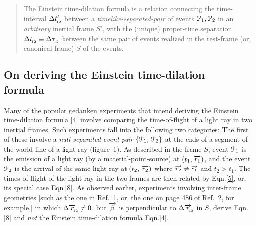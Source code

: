 \begin{quote} The Einstein time-dilation formula is a
relation connecting the time-interval $\Delta 
t'_{_{\hspace*{-1.5pt}{12}}}$ 
between a \textsl{timelike-sepa\break rated-pair} of events 
$\EuScript{P}_1 , \EuScript{P}_2$ in an 
\textsl{arbitrary} 
inertial frame $S'$, with the  (unique) proper-time 
separation $ \Delta t_{_{\hspace*{-1.5pt}{12}}}\equiv 
\Delta\tau_{_{\hspace*{-1.5pt}{12}}}$ 
between the same pair of events realized in the 
rest-frame 
(or, canonical-frame) $S$ of the events.
\end{quote}
\subsection{On deriving the  Einstein 
time-dilation\\  formula}
Many of the popular gedanken experiments that {intend} 
deriving  the Einstein time-dilation formula \eqref{4} 
involve comparing the time-of-flight of a light ray in 
two inertial frames. Such experiments fall into the 
following two categories: The first of these involve a 
\textsl{null-separated event-pair} $\{\EuScript{P}_1,\, 
\EuScript{P}_2\}$ at the ends of a segment of the world 
line of a light ray (figure~1). As described in the 
frame $S$, event $\EuScript{P}_1$ is the emission of a 
light ray (by a material-point-source) at $ (t_1,\, 
\overrightarrow{r_1})$, and the event $\EuScript{P}_2$ is the 
arrival of the same light ray at  $ (t_2,\,\overrightarrow{r_2})$ 
where $\overrightarrow{r_2}\neq \overrightarrow{r_1}$ and $ t_2>t_1$. The 
times-of-flight of the light ray in the two frames are 
then related by Eqn.\eqref{5}, or, its special case 
Eqn.\eqref{8}.  As observed earlier, experiments 
involving inter-frame geometries [such as the one in 
Ref.~1, or, the one on page 486 of Ref.~2, for 
example,] in which $\Delta \overrightarrow{r}_{_{\hspace*{-1.5pt}{\negthinspace\negthinspace 12}}} \neq 
0 $, but $ \overrightarrow{{\beta}}$ is perpendicular to $\Delta 
\overrightarrow{r}_{_{\hspace*{-1.5pt}{\negthinspace\negthinspace 12}}}$ in $S$,  derive Eqn.\eqref{8} 
and \textsl{not} the  Einstein time-dilation formula 
Eqn.\eqref{4}. 

